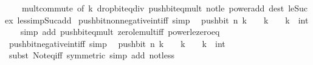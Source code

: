\begin{isabellebody}
\ \ \ \ mult{\isachardot}{\kern0pt}commute\ {\isacharbrackleft}{\kern0pt}of\ k{\isacharbrackright}{\kern0pt}\ drop{\isacharunderscore}{\kern0pt}bit{\isacharunderscore}{\kern0pt}eq{\isacharunderscore}{\kern0pt}div\ push{\isacharunderscore}{\kern0pt}bit{\isacharunderscore}{\kern0pt}eq{\isacharunderscore}{\kern0pt}mult\ not{\isacharunderscore}{\kern0pt}le\ power{\isacharunderscore}{\kern0pt}add\ dest{\isacharbang}{\kern0pt}{\isacharcolon}{\kern0pt}\ le{\isacharunderscore}{\kern0pt}Suc{\isacharunderscore}{\kern0pt}ex\ less{\isacharunderscore}{\kern0pt}imp{\isacharunderscore}{\kern0pt}Suc{\isacharunderscore}{\kern0pt}add{\isacharparenright}{\kern0pt}%
\endisatagproof
{\isafoldproof}%
%
\isadelimproof
\isanewline
%
\endisadelimproof
\isanewline
{}\isamarkupfalse%
\ push{\isacharunderscore}{\kern0pt}bit{\isacharunderscore}{\kern0pt}nonnegative{\isacharunderscore}{\kern0pt}int{\isacharunderscore}{\kern0pt}iff\ {\isacharbrackleft}{\kern0pt}simp{\isacharbrackright}{\kern0pt}{\isacharcolon}{\kern0pt}\isanewline
\ \ {\isacartoucheopen}push{\isacharunderscore}{\kern0pt}bit\ n\ k\ {\isasymge}\ {}\ {\isasymlongleftrightarrow}\ k\ {\isasymge}\ {}{\isacartoucheclose}\ \ k\ {\isacharcolon}{\kern0pt}{\isacharcolon}{\kern0pt}\ int\isanewline
%
\isadelimproof
\ \ %
\endisadelimproof
%
\isatagproof
{}\isamarkupfalse%
\ {\isacharparenleft}{\kern0pt}simp\ add{\isacharcolon}{\kern0pt}\ push{\isacharunderscore}{\kern0pt}bit{\isacharunderscore}{\kern0pt}eq{\isacharunderscore}{\kern0pt}mult\ zero{\isacharunderscore}{\kern0pt}le{\isacharunderscore}{\kern0pt}mult{\isacharunderscore}{\kern0pt}iff\ power{\isacharunderscore}{\kern0pt}le{\isacharunderscore}{\kern0pt}zero{\isacharunderscore}{\kern0pt}eq{\isacharparenright}{\kern0pt}%
\endisatagproof
{\isafoldproof}%
%
\isadelimproof
\isanewline
%
\endisadelimproof
\isanewline
{}\isamarkupfalse%
\ push{\isacharunderscore}{\kern0pt}bit{\isacharunderscore}{\kern0pt}negative{\isacharunderscore}{\kern0pt}int{\isacharunderscore}{\kern0pt}iff\ {\isacharbrackleft}{\kern0pt}simp{\isacharbrackright}{\kern0pt}{\isacharcolon}{\kern0pt}\isanewline
\ \ {\isacartoucheopen}push{\isacharunderscore}{\kern0pt}bit\ n\ k\ {\isacharless}{\kern0pt}\ {}\ {\isasymlongleftrightarrow}\ k\ {\isacharless}{\kern0pt}\ {}{\isacartoucheclose}\ \ k\ {\isacharcolon}{\kern0pt}{\isacharcolon}{\kern0pt}\ int\isanewline
%
\isadelimproof
\ \ %
\endisadelimproof
%
\isatagproof
{}\isamarkupfalse%
\ {\isacharparenleft}{\kern0pt}subst\ Not{\isacharunderscore}{\kern0pt}eq{\isacharunderscore}{\kern0pt}iff\ {\isacharbrackleft}{\kern0pt}symmetric{\isacharbrackright}{\kern0pt}{\isacharparenright}{\kern0pt}\ {\isacharparenleft}{\kern0pt}simp\ add{\isacharcolon}{\kern0pt}\ not{\isacharunderscore}{\kern0pt}less{\isacharparenright}{\kern0pt}%

\end{isabellebody}
